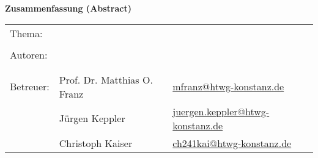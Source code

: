 
\begin{center}
{\Large \textbf{Zusammenfassung (Abstract)}}
\end{center}

\bigskip

\begin{center}
	\begin{tabular}{p{2.8cm}p{5cm}p{5cm}}
		Thema: & \multicolumn{2}{p{10cm}}{\raggedright\strTopic} \\
		 & & \\
		Autoren: & \strAuthorA & \href{mailto:\strAuthorAEmail}{\strAuthorAEmail} \\
		 & \strAuthorB & \href{mailto:\strAuthorBEmail}{\strAuthorBEmail} \\
		 & & \\
		Betreuer: & Prof. Dr. Matthias O. Franz & \href{mailto:mfranz@htwg-konstanz.de}{mfranz@htwg-konstanz.de} \\
		 &  Jürgen Keppler & \href{mailto:juergen.keppler@htwg-konstanz.de}{juergen.keppler@htwg-konstanz.de} \\
		 &  Christoph Kaiser & \href{mailto:Christop.kaiser@htwg-konstanz.de}{ch241kai@htwg-konstanz.de} \\
	\end{tabular}
\end{center}

\bigskip

\noindent
\strAbstract

\thispagestyle{preface}


